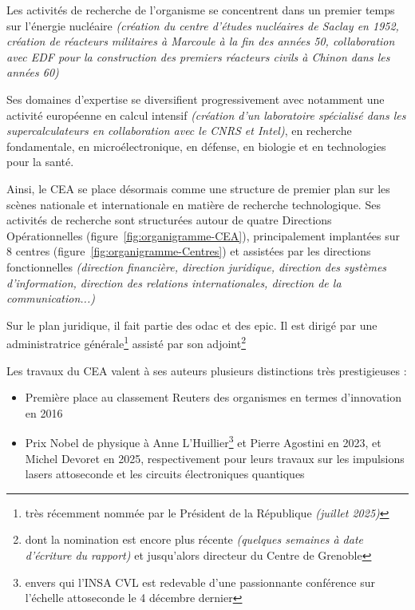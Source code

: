    Les activités de recherche de l'organisme se concentrent dans un premier temps sur l'énergie nucléaire \textit{(création du centre d'études nucléaires de Saclay en 1952, création de réacteurs militaires à Marcoule à la fin des années 50, collaboration avec EDF pour la construction des premiers réacteurs civils à Chinon dans les années 60)}\cite{wiki_CEA}

    Ses domaines d'expertise se diversifient progressivement avec notamment une activité européenne en calcul intensif \textit{(création d'un laboratoire spécialisé dans les supercalculateurs en collaboration avec le CNRS et Intel)}, en recherche fondamentale, en microélectronique, en défense, en biologie et en technologies pour la santé.

    Ainsi, le \gls{CEA} se place désormais comme une structure de premier plan sur les scènes nationale et internationale en matière de recherche technologique.
    Ses activités de recherche sont structurées autour de quatre Directions Opérationnelles (figure~\ref{fig:organigramme-CEA}), principalement implantées sur 8 centres (figure~\ref{fig:organigramme-Centres}) et assistées par les directions fonctionnelles \textit{(direction financière, direction juridique, direction des systèmes d'information, direction des relations internationales, direction de la communication...)}

    Sur le plan juridique, il fait partie des \gls{odac} et des \gls{epic}.
    Il est dirigé par une administratrice générale\footnote{très récemment nommée par le Président de la République \textit{(juillet 2025)}} assisté par son adjoint\footnote{dont la nomination est encore plus récente \textit{(quelques semaines à date d'écriture du rapport)} et jusqu'alors directeur du Centre de Grenoble}

    Les travaux du \gls{CEA} valent à ses auteurs plusieurs distinctions très prestigieuses :
    \begin{itemize}
        \item Première place au classement Reuters des organismes en termes d'innovation en 2016
        \item Prix Nobel de physique à Anne L'Huillier\footnote{envers qui l'INSA CVL est redevable d'une passionnante conférence sur l'échelle attoseconde le 4 décembre dernier} et Pierre Agostini en 2023, et Michel Devoret en 2025, respectivement pour leurs travaux sur les impulsions lasers attoseconde et les circuits électroniques quantiques
    \end{itemize}

